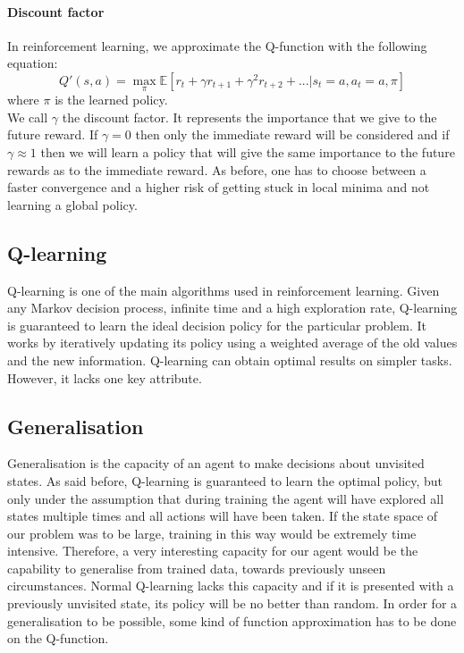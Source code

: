 \paragraph{Discount factor}
In reinforcement learning, we approximate the Q-function with the following equation:
\begin{equation}
	Q'(s,a) = \max_{\pi} \mathbb{E}[r_t+\gamma r_{t+1}+\gamma^2 r_{t+2}+...| s_t=a, a_t = a,\pi]
\end{equation}
where $\pi$ is the learned policy.\\
We call $\gamma$ the discount factor. It represents the importance that we give to the future reward. If $\gamma = 0$ then only the immediate reward will be considered and if $\gamma \approx 1$ then we will learn a policy that will give the same importance to the future rewards as to the immediate reward. As before, one has to choose between a faster convergence and a higher risk of getting stuck in local minima and not learning a global policy.
\subsection{Q-learning}
Q-learning \cite{watkins1992q} is one of the main algorithms used in reinforcement learning. Given any Markov decision process, infinite time and a high exploration rate, Q-learning is guaranteed to learn the ideal decision policy for the particular problem. It works by iteratively updating its policy using a weighted average of the old values and the new information. Q-learning can obtain optimal results on simpler tasks. However, it lacks one key attribute.
\subsection{Generalisation}
Generalisation is the capacity of an agent to make decisions about unvisited states. As said before, Q-learning is guaranteed to learn the optimal policy, but only under the assumption that during training the agent will have explored all states multiple times and all actions will have been taken. If the state space of our problem was to be large, training in this way would be extremely time intensive. Therefore, a very interesting capacity for our agent would be the capability to generalise from trained data, towards previously unseen circumstances. Normal Q-learning lacks this capacity and if it is presented with a previously unvisited state, its policy will be no better than random.  In order for a generalisation to be possible, some kind of function approximation has to be done on the Q-function.
